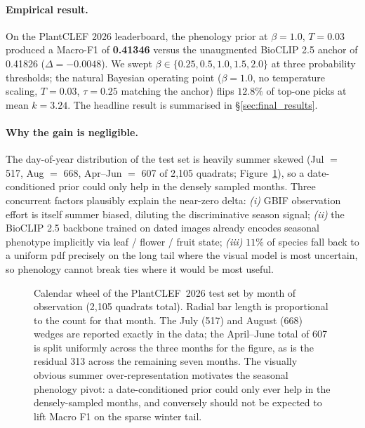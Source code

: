 \paragraph{Empirical result.} On the PlantCLEF 2026 leaderboard, the phenology prior at $\beta{=}1.0$, $T{=}0.03$ produced a Macro-F1 of \textbf{0.41346} versus the unaugmented BioCLIP 2.5 anchor of 0.41826 ($\Delta = -0.0048$). We swept $\beta \in \{0.25, 0.5, 1.0, 1.5, 2.0\}$ at three probability thresholds; the natural Bayesian operating point ($\beta{=}1.0$, no temperature scaling, $T{=}0.03$, $\tau{=}0.25$ matching the anchor) flips $12.8\%$ of top-one picks at mean $k{=}3.24$. The headline result is summarised in \S\ref{sec:final_results}.

\paragraph{Why the gain is negligible.} The day-of-year distribution of the test set is heavily summer skewed (Jul $=$ 517, Aug $=$ 668, Apr--Jun $=$ 607 of 2{,}105 quadrats; Figure~\ref{fig:test_doy_wheel}), so a date-conditioned prior could only help in the densely sampled months. Three concurrent factors plausibly explain the near-zero delta: \textit{(i)} GBIF observation effort is itself summer biased, diluting the discriminative season signal; \textit{(ii)} the BioCLIP 2.5 backbone trained on dated images already encodes seasonal phenotype implicitly via leaf / flower / fruit state; \textit{(iii)} $11\%$ of species fall back to a uniform pdf precisely on the long tail where the visual model is most uncertain, so phenology cannot break ties where it would be most useful.

\begin{figure}[!htbp]
  \centering
  \resizebox{0.82\linewidth}{!}{}
  \caption{Calendar wheel of the PlantCLEF~2026 test set by month of observation (2{,}105 quadrats total). Radial bar length is proportional to the count for that month. The July (517) and August (668) wedges are reported exactly in the data; the April--June total of 607 is split uniformly across the three months for the figure, as is the residual 313 across the remaining seven months. The visually obvious summer over-representation motivates the seasonal phenology pivot: a date-conditioned prior could only ever help in the densely-sampled months, and conversely should not be expected to lift Macro F1 on the sparse winter tail.}
  \label{fig:test_doy_wheel}
\end{figure}

